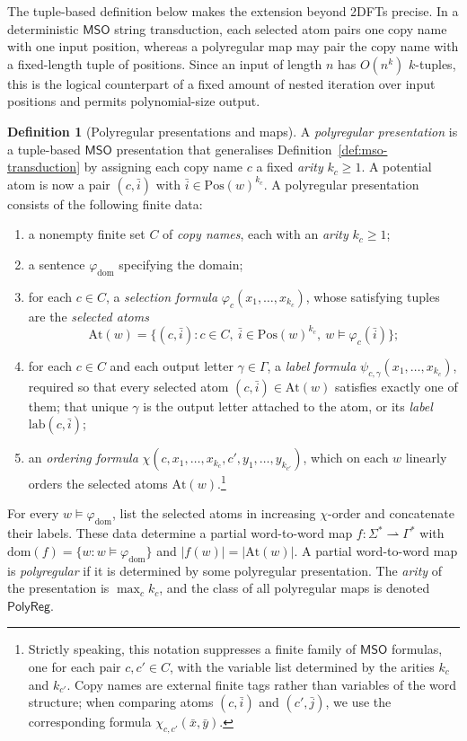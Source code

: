 \documentclass[11pt]{article}
\theoremstyle{definition}
\newtheorem{definition}[theorem]{Definition}
\newcommand{\MSO}{\mathsf{MSO}}
\newcommand{\polyreg}{\mathsf{PolyReg}}
\begin{document}
The tuple-based definition below makes the extension beyond 2DFTs precise.  In
a deterministic $\MSO$ string transduction, each selected atom pairs one copy
name with one input position, whereas a polyregular map may pair the copy name
with a fixed-length tuple of positions.  Since an input of length $n$ has $O(n^k)$
$k$-tuples, this is the logical counterpart of a fixed amount of nested
iteration over input positions and permits polynomial-size output.

\begin{definition}[Polyregular presentations and maps]
\label{def:polyregular}
A \emph{polyregular presentation} is a tuple-based $\MSO$ presentation that
generalises Definition~\ref{def:mso-transduction} by assigning each copy name $c$
a fixed \emph{arity} $k_c\ge 1$.  A potential atom is now a pair
$(c,\bar i)$ with $\bar i\in\mathrm{Pos}(w)^{k_c}$.  A polyregular
presentation consists of the following finite data:
\begin{enumerate}[label=(\roman*)]
\item a nonempty finite set $C$ of \emph{copy names}, each with an \emph{arity}
$k_c\ge 1$;
\item a sentence $\varphi_{\mathrm{dom}}$ specifying the domain;
\item for each $c\in C$, a \emph{selection formula}
$\varphi_c(x_1,\ldots,x_{k_c})$, whose satisfying tuples are the \emph{selected
atoms}
\[
   \mathrm{At}(w)
   =\{(c,\bar i):c\in C,\ \bar i\in\mathrm{Pos}(w)^{k_c},
     \ w\models\varphi_c(\bar i)\};
\]
\item for each $c\in C$ and each output letter $\gamma\in\Gamma$, a
\emph{label formula} $\psi_{c,\gamma}(x_1,\ldots,x_{k_c})$, required so that
every selected atom $(c,\bar i)\in\mathrm{At}(w)$ satisfies exactly one of them;
that unique $\gamma$ is the output letter attached to the atom, or its
\emph{label} $\mathrm{lab}(c,\bar i)$;
\item an \emph{ordering formula}
$\chi(c,x_1,\ldots,x_{k_c},c',y_1,\ldots,y_{k_{c'}})$, which on each $w$
linearly orders the selected atoms $\mathrm{At}(w)$.\footnote{Strictly speaking,
this notation suppresses a finite family of $\MSO$ formulas, one for each pair
$c,c'\in C$, with the variable list determined by the arities $k_c$ and
$k_{c'}$.  Copy names are external finite tags rather than variables of the
word structure; when comparing atoms $(c,\bar i)$ and $(c',\bar j)$, we use the
corresponding formula $\chi_{c,c'}(\bar x,\bar y)$.}
\end{enumerate}
For every $w\models\varphi_{\mathrm{dom}}$, list the selected atoms in increasing
$\chi$-order and concatenate their labels.  These data determine a partial
word-to-word map $f\colon\Sigma^*\rightharpoonup\Gamma^*$ with
$\mathrm{dom}(f)=\{w:w\models\varphi_{\mathrm{dom}}\}$ and
$|f(w)|=|\mathrm{At}(w)|$.  A partial word-to-word map is \emph{polyregular}
if it is determined by some polyregular presentation.  The \emph{arity} of the
presentation is $\max_c k_c$, and the class of all polyregular maps is denoted
$\polyreg$.
\end{definition}
\end{document}
